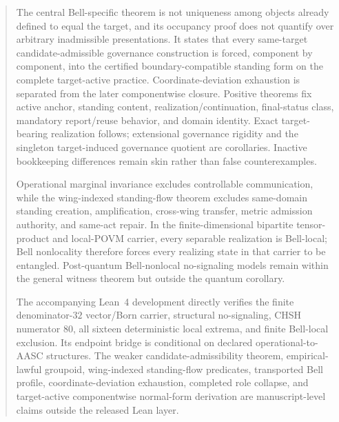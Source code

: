 \documentclass[11pt]{article}
\theoremstyle{definition}
\begin{document}
\begin{abstract}
The central Bell-specific theorem is not uniqueness among objects already defined to equal the target, and its occupancy proof does not quantify over arbitrary inadmissible presentations. It states that every same-target candidate-admissible governance construction is forced, component by component, into the certified boundary-compatible standing form on the complete target-active practice. Coordinate-deviation exhaustion is separated from the later componentwise closure. Positive theorems fix active anchor, standing content, realization/continuation, final-status class, mandatory report/reuse behavior, and domain identity. Exact target-bearing realization follows; extensional governance rigidity and the singleton target-induced governance quotient are corollaries. Inactive bookkeeping differences remain skin rather than false counterexamples.

Operational marginal invariance excludes controllable communication, while the wing-indexed standing-flow theorem excludes same-domain standing creation, amplification, cross-wing transfer, metric admission authority, and same-act repair. In the finite-dimensional bipartite tensor-product and local-POVM carrier, every separable realization is Bell-local; Bell nonlocality therefore forces every realizing state in that carrier to be entangled. Post-quantum Bell-nonlocal no-signaling models remain within the general witness theorem but outside the quantum corollary.

The accompanying Lean~4 development directly verifies the finite denominator-$32$ vector/Born carrier, structural no-signaling, CHSH numerator $80$, all sixteen deterministic local extrema, and finite Bell-local exclusion. Its endpoint bridge is conditional on declared operational-to-AASC structures. The weaker candidate-admissibility theorem, empirical-lawful groupoid, wing-indexed standing-flow predicates, transported Bell profile, coordinate-deviation exhaustion, completed role collapse, and target-active componentwise normal-form derivation are manuscript-level claims outside the released Lean layer.
\end{abstract}
\end{document}
